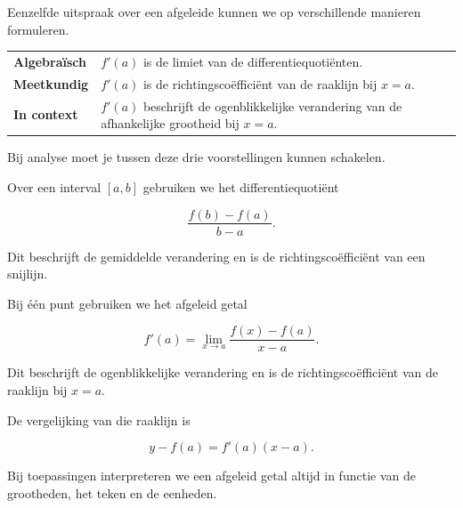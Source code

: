\documentclass{ximera}
\begin{document}


Eenzelfde uitspraak over een afgeleide kunnen we op verschillende
manieren formuleren.

\begin{center}
\begin{tabular}{p{}|p{}}
\textbf{Algebraïsch}
&
$f'(a)$ is de limiet van de differentiequotiënten.
\\[2mm]

\textbf{Meetkundig}
&
$f'(a)$ is de richtingscoëfficiënt van de raaklijn bij $x=a$.
\\[2mm]

\textbf{In context}
&
$f'(a)$ beschrijft de ogenblikkelijke verandering van de
afhankelijke grootheid bij $x=a$.
\end{tabular}
\end{center}

Bij analyse moet je tussen deze drie voorstellingen kunnen schakelen.






Over een interval $[a,b]$ gebruiken we het differentiequotiënt

\[
\boxed{
\frac{f(b)-f(a)}{b-a}
}.
\]

Dit beschrijft de gemiddelde verandering en is de
richtingscoëfficiënt van een snijlijn.

Bij één punt gebruiken we het afgeleid getal

\[
\boxed{
f'(a)
=
\lim_{x\to a}
\frac{f(x)-f(a)}{x-a}
}.
\]

Dit beschrijft de ogenblikkelijke verandering en is de
richtingscoëfficiënt van de raaklijn bij $x=a$.

De vergelijking van die raaklijn is

\[
\boxed{
y-f(a)=f'(a)(x-a)
}.
\]

Bij toepassingen interpreteren we een afgeleid getal altijd
in functie van de grootheden, het teken en de eenheden.
\end{document}
